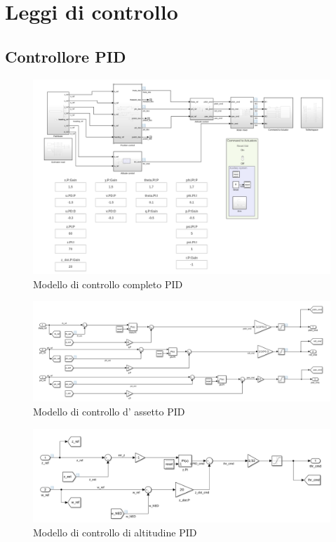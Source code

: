 \section{Leggi di controllo}
\subsection{Controllore PID}

\begin{figure}
	\centering
	\includegraphics[width=1\textwidth]{SistemaQuadrirotore/Figure/completopid}
	\caption{Modello di controllo completo PID}
\end{figure}

\begin{figure}
	\centering
	\includegraphics[width=1\textwidth]{SistemaQuadrirotore/Figure/attitudecontrollerpid}
	\caption{Modello di controllo d' assetto PID}
\end{figure}

\begin{figure}
	\centering
	\includegraphics[width=1\textwidth]{SistemaQuadrirotore/Figure/altitudecontrollerpid}
	\caption{Modello di controllo di altitudine PID}
\end{figure}

